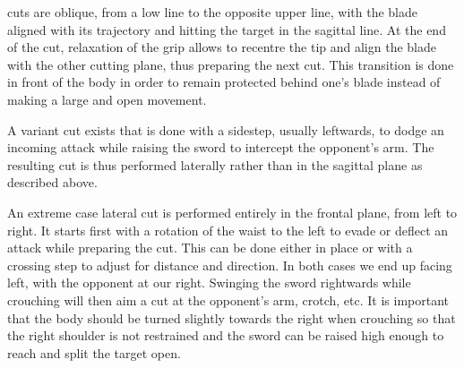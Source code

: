 \Liao{} cuts are oblique, from a low line to the opposite upper line, with the blade aligned with its trajectory and hitting the target in the sagittal line. At the end of the cut, relaxation of the grip allows to recentre the tip and align the blade with the other cutting plane, thus preparing the next \Liao{} cut. This transition is done in front of the body in order to remain protected behind one's blade instead of making a large and open movement. 

A variant \Liao{} cut exists that is done with a sidestep, usually leftwards, to dodge an incoming attack while raising the sword to intercept the opponent's arm. The resulting cut is thus performed laterally rather than in the sagittal plane as described above.

An extreme case lateral \Liao{} cut is performed entirely in the frontal plane, from left to right. It starts first with a rotation of the waist to the left to evade or deflect an attack while preparing the cut. This can be done either in place or with a crossing step to adjust for distance and direction. In both cases we end up facing left, with the opponent at our right. Swinging the sword rightwards while crouching will then aim a \Liao{} cut at the opponent's arm, crotch, etc. It is important that the body should be turned slightly towards the right  when crouching so that the right shoulder is not restrained and the sword can be raised high enough to reach and split the target open. 




